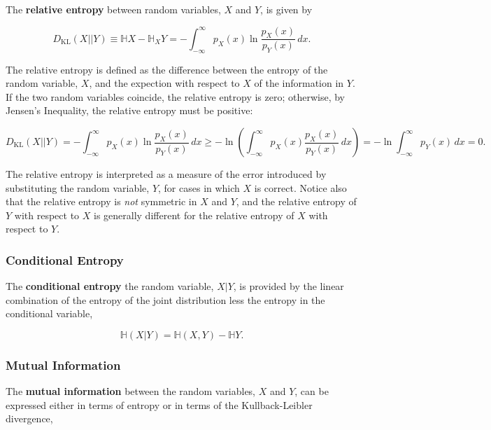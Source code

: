 \documentclass[12pt, twoside, draft]{article}
\begin{document}
The \textbf{relative entropy} between random variables, $X$ and $Y$, is given by

\begin{equation}
D_{\text{KL}}(X||Y) \equiv \mathbb{H}X - \mathbb{H}_X Y = -\int_{-\infty}^{\infty} p_X (x) \ln \frac{p_X (x)}{p_Y(x)}\,dx.
\end{equation}

The relative entropy is defined as the difference between the entropy of the random variable, $X$, and the expection  with respect to $X$ of the information in $Y$. If the two random variables coincide, the relative entropy is zero; otherwise, by Jensen's Inequality, the relative entropy must be positive:

\begin{equation}
D_{\text{KL}}(X||Y) = -\int_{-\infty}^{\infty} p_X (x) \ln \frac{p_X (x)}{p_Y(x)}\,dx  \geq -\ln\left( \int_{-\infty}^{\infty} p_X (x) \frac{p_X (x)}{p_Y(x)}\,dx\right) = -\ln \int_{-\infty}^{\infty}p_Y (x)\,dx = 0.
\end{equation}

The relative entropy is interpreted as a measure of the error introduced by substituting the random variable, $Y$, for cases in which $X$ is correct.  Notice also that the relative entropy is \textit{not} symmetric in $X$ and $Y$, and the relative entropy of $Y$ with respect to $X$ is generally different for the relative entropy of $X$ with respect to $Y$.
\subsubsection{Conditional Entropy}\label{sec:conditional_entropy}

The \textbf{conditional entropy} the random variable, $X|Y$, is provided by the linear combination of the entropy of the joint distribution less the entropy in the conditional variable,

\begin{equation}
\mathbb{H}(X|Y) = \mathbb{H}(X,Y) - \mathbb{H}Y.
\end{equation}
\subsubsection{Mutual Information}\label{sec:mutual_information}

The \textbf{mutual information} between the random variables, $X$ and $Y$, can be expressed either in terms of entropy or in terms of the Kullback-Leibler divergence,
\end{document}
